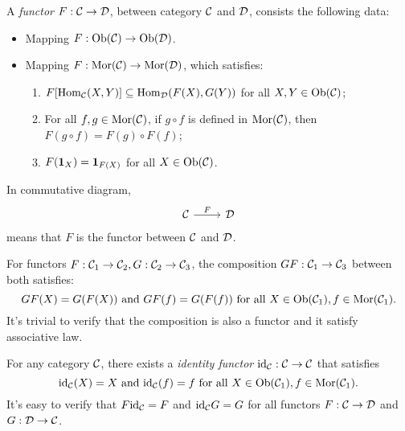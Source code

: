 \documentclass{article}
\begin{document}
\begin{defi}\label{functor}
	A \emph{functor} $F:\mathcal{C}\to\mathcal{D}$, between category $\mathcal{C}$ and $\mathcal{D}$, consists the following data:
	\begin{itemize}
		\item Mapping $F:\mathrm{Ob}(\mathcal{C})\to\mathrm{Ob}(\mathcal{D})$.
		\item Mapping $F:\mathrm{Mor}(\mathcal{C})\to\mathrm{Mor}(\mathcal{D})$, which satisfies:
		\begin{enumerate}
			\item $F[\mathrm{Hom}_{\mathcal{C}}(X,Y)]\subseteq\mathrm{Hom}_{\mathcal{D}}(F(X),G(Y))$ for all $X,Y\in\mathrm{Ob}(\mathcal{C})$;
			\item For all $f,g\in\mathrm{Mor}(\mathcal{C})$, if $g\circ f$ is defined in $\mathrm{Mor}(\mathcal{C})$, then $F(g\circ f)=F(g)\circ F(f)$;
			\item $F(\mathbf{1}_X)=\mathbf{1}_{F(X)}$ for all $X\in\mathrm{Ob}(\mathcal{C})$.
		\end{enumerate}
	\end{itemize}
	
	In commutative diagram,
	\[\begin{tikzcd}
			\C\arrow[r,"F"] & \D
	\end{tikzcd}\]
	means that $F$ is the functor between $\mathcal{C}$ and $\mathcal{D}$.
	
	For functors $F:\mathcal{C}_1\to\mathcal{C}_2,G:\mathcal{C}_2\to\mathcal{C}_3$, the composition $GF:\mathcal{C}_1\to\mathcal{C}_3$ between both satisfies:
		\[GF(X)=G(F(X))\ \text{and}\ GF(f)=G(F(f))\ \text{for all}\ X\in\Ob(\C_1),f\in\Mor(\C_1).\]
	It's trivial to verify that the composition is also a functor and it satisfy associative law.
	
	For any category $\mathcal{C}$, there exists a \emph{identity functor} $\mathrm{id}_{\mathcal{C}}:\mathcal{C}\to\mathcal{C}$ that satisfies
		\[\mathrm{id}_{\mathcal{C}}(X)=X\ \text{and}\ \mathrm{id}_{\mathcal{C}}(f)=f\ \text{for all}\ X\in\mathrm{Ob}(\mathcal{C}_1),f\in\mathrm{Mor}(\mathcal{C}_1).\]
	It's easy to verify that $F\mathrm{id}_{\mathcal{C}}=F$ and $\mathrm{id}_{\mathcal{C}} G=G$ for all functors $F:\mathcal{C}\to\mathcal{D}$ and $G:\mathcal{D}\to\mathcal{C}$.
\end{defi}
\end{document}
